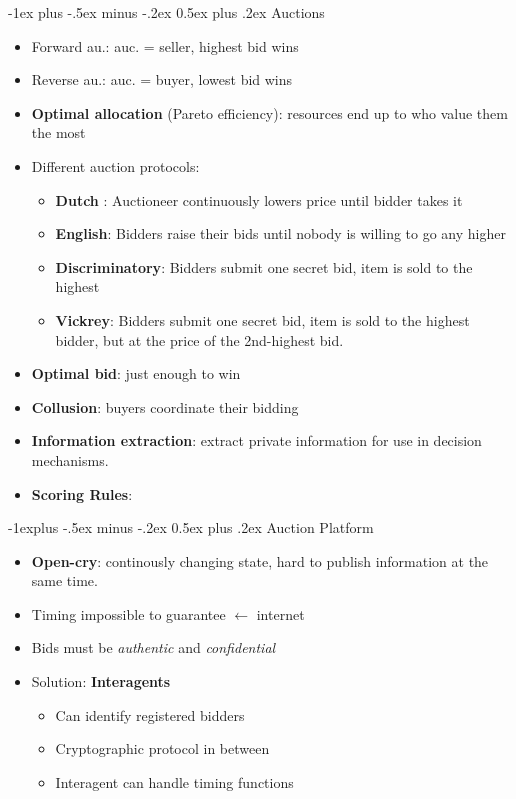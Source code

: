 \documentclass[10pt,a4paper,landscape]{article}
\makeatletter
\renewcommand{\section}{\@startsection{section}{1}{0mm}%
                                {-1ex plus -.5ex minus -.2ex}%
                                {0.5ex plus .2ex}%
                                {\normalfont\small\bfseries}}
\renewcommand{\subsection}{\@startsection{subsection}{2}{0mm}%
                                {-1explus -.5ex minus -.2ex}%
                                {0.5ex plus .2ex}%
                                {\normalfont\small\bfseries}}
\makeatother
\begin{document}
\begin{multicols*}{2}
\section{Auctions}
\begin{itemize}
	\item Forward au.: auc. = seller, highest bid wins
	\item Reverse au.: auc. = buyer, lowest bid wins
	\item \textbf{Optimal allocation} (Pareto efficiency): resources end up to who value them the most
	\item Different auction protocols:
	\begin{itemize}
		\item \textbf{Dutch} : Auctioneer continuously lowers price until bidder takes it
		\item \textbf{English}: Bidders raise their bids until nobody is willing to go any higher
		\item \textbf{Discriminatory}: Bidders submit one secret bid, item is sold to the highest
		\item \textbf{Vickrey}: Bidders submit one secret bid, item is sold to the highest bidder, but at the price of the 2nd-highest bid.
	\end{itemize}
	\item \textbf{Optimal bid}: just enough to win
	\item \textbf{Collusion}: buyers coordinate their bidding
	\item \textbf{Information extraction}: extract private information for use in decision mechanisms.
	\item \textbf{Scoring Rules}: 
\end{itemize}

\subsection{Auction Platform}
\begin{itemize}
	\item \textbf{Open-cry}: continously changing state, hard to publish information at the same time.
	\item Timing impossible to guarantee $\leftarrow$ internet
	\item Bids must be \textit{authentic} and \textit{confidential}
	\item Solution: \textbf{Interagents}
	\begin{itemize}
		\item Can identify registered bidders  
		\item Cryptographic protocol in between
		\item Interagent can handle timing functions
	\end{itemize}
\end{itemize}

\end{multicols*}
\end{document}
